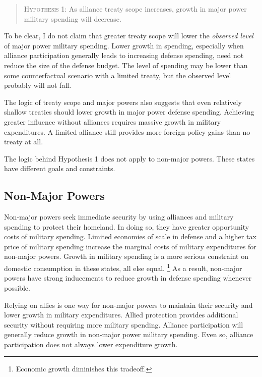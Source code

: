 \documentclass[12pt]{article}
\begin{document}
\begin{quote}
\textsc{Hypothesis 1}: As alliance treaty scope increases, growth in major power military spending will decrease. 
\end{quote}


To be clear, I do not claim that greater treaty scope will lower the \textit{observed level} of major power military spending. 
Lower growth in spending, especially when alliance participation generally leads to increasing defense spending, need not reduce the size of the defense budget. 
The level of spending may be lower than some counterfactual scenario with a limited treaty, but the observed level probably will not fall. 


The logic of treaty scope and major powers also suggests that even relatively shallow treaties should lower growth in major power defense spending. 
Achieving greater influence without alliances requires massive growth in military expenditures. 
A limited alliance still provides more foreign policy gains than no treaty at all. 


The logic behind Hypothesis 1 does not apply to non-major powers. 
These states have different goals and constraints. 


\subsection{Non-Major Powers} 


Non-major powers seek immediate security by using alliances and military spending to protect their homeland.  
In doing so, they have greater opportunity costs of military spending. 
Limited economies of scale in defense and a higher tax price of military spending increase the marginal costs of military expenditures for non-major powers. 
Growth in military spending is a more serious constraint on domestic consumption in these states, all else equal.
\footnote{Economic growth diminishes this tradeoff.} 
As a result, non-major powers have strong inducements to reduce growth in defense spending whenever possible.


Relying on allies is one way for non-major powers to maintain their security and lower growth in military expenditures.  
Allied protection provides additional security without requiring more military spending. 
Alliance participation will generally reduce growth in non-major power military spending. 
Even so, alliance participation does not always lower expenditure growth.
 
\end{document}
